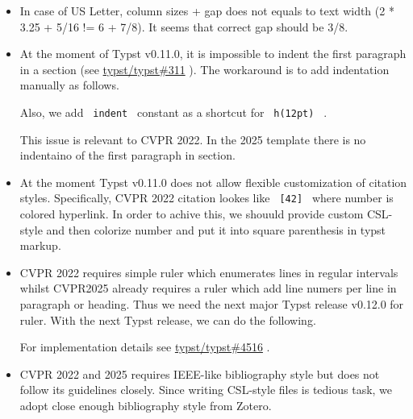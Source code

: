 \begin{itemize}
\item
  In case of US Letter, column sizes + gap does not equals to text width
  (2 * 3.25 + 5/16 != 6 + 7/8). It seems that correct gap should be 3/8.
\item
  At the moment of Typst v0.11.0, it is impossible to indent the first
  paragraph in a section (see
  \href{https://github.com/typst/typst/issues/311}{typst/typst\#311} ).
  The workaround is to add indentation manually as follows.

\begin{Shaded}
\begin{Highlighting}[]


\end{Highlighting}
\end{Shaded}

  Also, we add \texttt{\ indent\ } constant as a shortcut for
  \texttt{\ h(12pt)\ } .

  This issue is relevant to CVPR 2022. In the 2025 template there is no
  indentaino of the first paragraph in section.
\item
  At the moment Typst v0.11.0 does not allow flexible customization of
  citation styles. Specifically, CVPR 2022 citation lookes like
  \texttt{\ {[}42{]}\ } where number is colored hyperlink. In order to
  achive this, we shouuld provide custom CSL-style and then colorize
  number and put it into square parenthesis in typst markup.
\item
  CVPR 2022 requires simple ruler which enumerates lines in regular
  intervals whilst CVPR2025 already requires a ruler which add line
  numers per line in paragraph or heading. Thus we need the next major
  Typst release v0.12.0 for ruler. With the next Typst release, we can
  do the following.

\begin{Shaded}
\begin{Highlighting}[]
\end{Highlighting}
\end{Shaded}

  For implementation details see
  \href{https://github.com/typst/typst/pull/4516}{typst/typst\#4516} .
\item
  CVPR 2022 and 2025 requires IEEE-like bibliography style but does not
  follow its guidelines closely. Since writing CSL-style files is
  tedious task, we adopt close enough bibliography style from Zotero.
\end{itemize}

